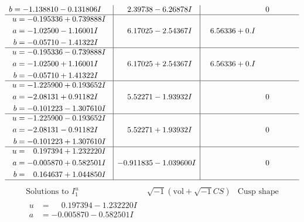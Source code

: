 \documentclass[1p]{elsarticle_modified}
\theoremstyle{definition}
\newcommand{\I}{\sqrt{-1}}
\begin{document}
$$\begin{array}{c|c|c}
\begin{aligned}
b &= -1.138810 - 0.131806 I\end{aligned}
 & \phantom{-}2.39738 - 6.26878 I & \phantom{-0.000000 } 0 \\ \hline\begin{aligned}
u &= -0.195336 + 0.739888 I \\
a &= -1.02500 - 1.16001 I \\
b &= -0.05710 - 1.41322 I\end{aligned}
 & \phantom{-}6.17025 - 2.54367 I & \phantom{-}6.56336 + 0. I\phantom{ +0.000000I} \\ \hline\begin{aligned}
u &= -0.195336 - 0.739888 I \\
a &= -1.02500 + 1.16001 I \\
b &= -0.05710 + 1.41322 I\end{aligned}
 & \phantom{-}6.17025 + 2.54367 I & \phantom{-}6.56336 + 0. I\phantom{ +0.000000I} \\ \hline\begin{aligned}
u &= -1.225900 + 0.193652 I \\
a &= -2.08131 + 0.91182 I \\
b &= -0.101223 - 1.307610 I\end{aligned}
 & \phantom{-}5.52271 - 1.93932 I & \phantom{-0.000000 } 0 \\ \hline\begin{aligned}
u &= -1.225900 - 0.193652 I \\
a &= -2.08131 - 0.91182 I \\
b &= -0.101223 + 1.307610 I\end{aligned}
 & \phantom{-}5.52271 + 1.93932 I & \phantom{-0.000000 } 0 \\ \hline\begin{aligned}
u &= \phantom{-}0.197394 + 1.232220 I \\
a &= -0.005870 + 0.582501 I \\
b &= \phantom{-}0.164637 + 1.044850 I\end{aligned}
 & -0.911835 - 1.039600 I & \phantom{-0.000000 } 0\\
 \hline 
 \end{array}$$\newpage$$\begin{array}{c|c|c}  
\text{Solutions to }I^u_{1}& \I (\text{vol} + \sqrt{-1}CS) & \text{Cusp shape}\\
 \hline 
\begin{aligned}
u &= \phantom{-}0.197394 - 1.232220 I \\
a &= -0.005870 - 0.582501 I \\

\end{aligned}
\end{array}$$
\end{document}
